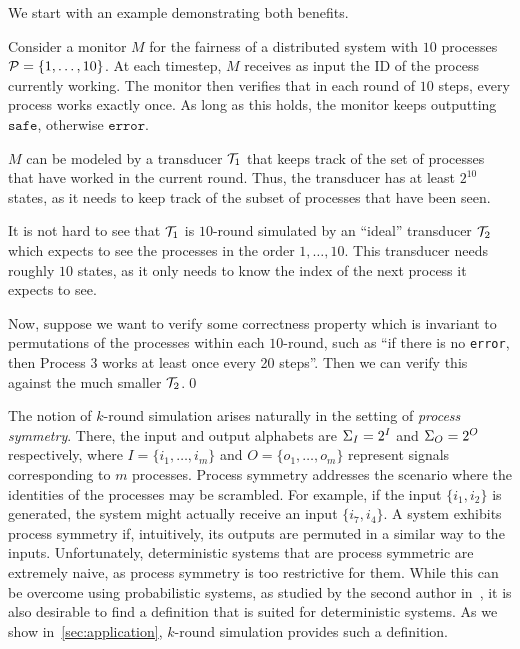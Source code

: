We start with an example demonstrating both benefits.
\begin{example}
\label{example:MC_rounds}
Consider a monitor $M$ for the fairness of a distributed system with $10$ processes $\mathcal{P}=\{1,\ldots,10\}$. At each timestep, $M$ receives as input the ID of the process currently working. The monitor then verifies that in each round of $10$ steps, every process works exactly once. As long as this holds, the monitor keeps outputting $\texttt{safe}$, otherwise $\texttt{error}$.

$M$ can be modeled by a transducer $\mathcal{T}_1$ that keeps track of the set of processes that have worked in the current round. Thus, the transducer has at least $2^{10}$ states, as it needs to keep track of the subset of processes that have been seen.

It is not hard to see that $\mathcal{T}_1$ is $10$-round simulated by an ``ideal'' transducer $\mathcal{T}_2$ which expects to see the processes in the order $1,\ldots,10$. This transducer needs roughly $10$ states, as it only needs to know the index of the next process it expects to see.

Now, suppose we want to verify some correctness property which is invariant to permutations of the processes within each $10$-round, such as ``if there is no \texttt{error}, then Process $3$ works at least once every 20 steps''. Then we can verify this against the much smaller $\mathcal{T}_2$.\qed
\end{example}

The notion of $k$-round simulation arises naturally in the setting of \emph{process symmetry}. There, the input and output alphabets are $\Sigma_{I}=2^{I}$ and $\Sigma_{O}=2^{O}$ respectively, where $I=\{i_1,\ldots,i_m\}$ and $O=\{o_1,\ldots,o_m\}$ represent signals corresponding to $m$ processes. Process symmetry addresses the scenario where the identities of the processes may be scrambled. For example, if the input $\{i_1,i_2\}$ is generated, the system might actually receive an input $\{i_7,i_4\}$. A system exhibits process symmetry if, intuitively, its outputs are permuted in a similar way to the inputs. Unfortunately, deterministic systems that are process symmetric are extremely naive, as process symmetry is too restrictive for them. While this can be overcome using probabilistic systems, as studied by the second author in~\cite{Almagor2020b}, it is also desirable to find a definition that is suited for deterministic systems. As we show in~\autoref{sec:application}, $k$-round simulation provides such a definition.

